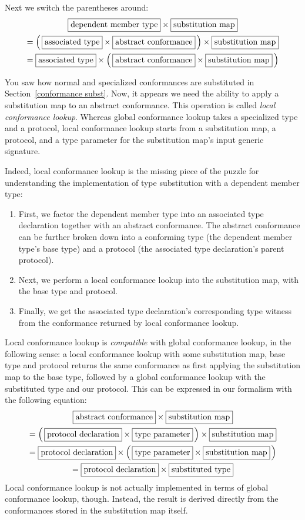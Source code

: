 \documentclass[a4paper,headsepline,bibliography=totoc,toc=flat,fleqn,twoside=semi]{scrbook}
\theoremstyle{definition}
\theoremstyle{definition}
\theoremstyle{definition}
\newcommand{\mathboxed}[1]{\boxed{\mbox{\vphantom{pI\texttt{pI}}#1}}}
\begin{document}
Next we switch the parentheses around:
\begin{multline*}
\mathboxed{dependent member type} \times \mathboxed{substitution map}\\
= \left(\,\mathboxed{associated type} \times \mathboxed{abstract conformance} \,\right) \times \mathboxed{substitution map}\\
= \mathboxed{associated type} \times \left(\,\mathboxed{abstract conformance} \times \mathboxed{substitution map} \,\right)
\end{multline*}

You saw how normal and specialized conformances are substituted in Section~\ref{conformance subst}. Now, it appears we need the ability to apply a substitution map to an abstract conformance. This operation is called \emph{local conformance lookup}. Whereas global conformance lookup takes a specialized type and a protocol, local conformance lookup starts from a substitution map, a protocol, and a type parameter for the substitution map's input generic signature.

Indeed, local conformance lookup is the missing piece of the puzzle for understanding the implementation of type substitution with a dependent member type:
\begin{enumerate}
\item First, we factor the dependent member type into an associated type declaration together with an abstract conformance. The abstract conformance can be further broken down into a conforming type (the dependent member type's base type) and a protocol (the associated type declaration's parent protocol).
\item Next, we perform a local conformance lookup into the substitution map, with the base type and protocol.
\item Finally, we get the associated type declaration's corresponding type witness from the conformance returned by local conformance lookup.
\end{enumerate}
Local conformance lookup is \emph{compatible} with global conformance lookup, in the following sense: a local conformance lookup with some substitution map, base type and protocol returns the same conformance as first applying the substitution map to the base type, followed by a global conformance lookup with the substituted type and our protocol. This can be expressed in our formalism with the following equation:
\begin{multline*}
\mathboxed{abstract conformance} \times \mathboxed{substitution map}\\
= \left(\, \mathboxed{protocol declaration} \times \mathboxed{type parameter} \,\right) \times \mathboxed{substitution map}\\
= \mathboxed{protocol declaration} \times \left(\, \mathboxed{type parameter} \times \mathboxed{substitution map} \,\right)\\
= \mathboxed{protocol declaration} \times \mathboxed{substituted type}
\end{multline*}
Local conformance lookup is not actually implemented in terms of global conformance lookup, though. Instead, the result is derived directly from the conformances stored in the substitution map itself.
\end{document}
